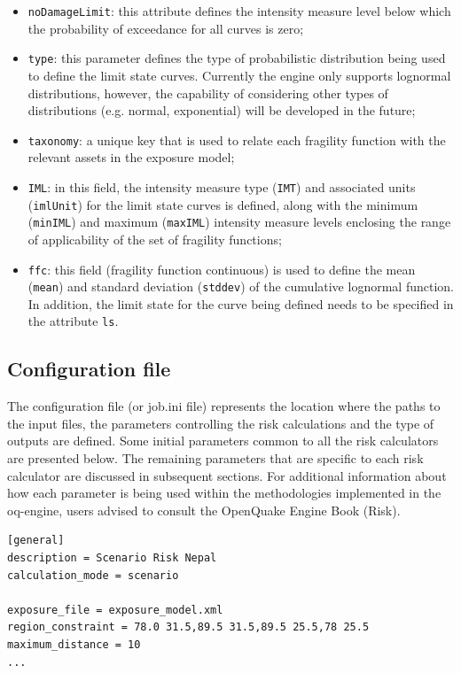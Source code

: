 \begin{itemize}
\item  \Verb+noDamageLimit+: this attribute defines the intensity measure level below which the probability of exceedance for all curves is zero;
\item  \Verb+type+: this parameter defines the type of probabilistic distribution being used to define the limit state curves. Currently the engine only supports lognormal distributions, however, the capability of considering other types of distributions (e.g. normal, exponential) will be developed in the future;
\item  \Verb+taxonomy+: a unique key that is used to relate each \gls{fragility function} with the relevant \glspl{asset} in the \gls{exposure model};  
\item  \Verb+IML+: in this field, the intensity measure type (\Verb+IMT+) and associated units (\Verb+imlUnit+) for the limit state curves is defined, along with the minimum (\Verb+minIML+) and maximum (\Verb+maxIML+) intensity measure levels enclosing the range of applicability of the set of fragility functions;
\item  \Verb+ffc+: this field (fragility function continuous) is used to define the mean (\Verb+mean+) and standard deviation (\Verb+stddev+) of the cumulative lognormal function. In addition, the limit state for the curve being defined needs to be specified in the attribute \Verb+ls+.
\end{itemize}

\subsection{Configuration file}
The configuration file (or job.ini file) represents the location where the paths to the input files, the parameters controlling the risk calculations and the type of outputs are defined. Some initial parameters common to all the risk calculators are presented below. The remaining parameters that are specific to each risk calculator are discussed in subsequent sections. For additional information about how each parameter is being used within the methodologies implemented in the oq-engine, users advised to consult the OpenQuake Engine Book (Risk). 

\begin{Verbatim}[frame=single, commandchars=\\\{\}, samepage=true]
[general]
description = Scenario Risk Nepal
calculation_mode = scenario

exposure_file = exposure_model.xml
region_constraint = 78.0 31.5,89.5 31.5,89.5 25.5,78 25.5
maximum_distance = 10
...
\end{Verbatim}

